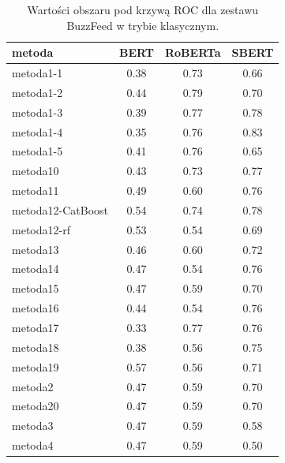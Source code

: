 \begin{table}[H]
	\centering
	\caption{Wartości obszaru pod krzywą ROC dla zestawu BuzzFeed w trybie klasycznym.}
	\label{tab:roc_auc_buzzfeed_classic}
	\small
	\begin{tabular}{lccc}
		\toprule
		\textbf{metoda}   & \textbf{BERT} & \textbf{RoBERTa} & \textbf{SBERT} \\
		\midrule
		metoda1-1         & 0.38          & 0.73             & 0.66           \\
		metoda1-2         & 0.44          & 0.79             & 0.70           \\
		metoda1-3         & 0.39          & 0.77             & 0.78           \\
		metoda1-4         & 0.35          & 0.76             & 0.83           \\
		metoda1-5         & 0.41          & 0.76             & 0.65           \\
		metoda10          & 0.43          & 0.73             & 0.77           \\
		metoda11          & 0.49          & 0.60             & 0.76           \\
		metoda12-CatBoost & 0.54          & 0.74             & 0.78           \\
		metoda12-rf       & 0.53          & 0.54             & 0.69           \\
		metoda13          & 0.46          & 0.60             & 0.72           \\
		metoda14          & 0.47          & 0.54             & 0.76           \\
		metoda15          & 0.47          & 0.59             & 0.70           \\
		metoda16          & 0.44          & 0.54             & 0.76           \\
		metoda17          & 0.33          & 0.77             & 0.76           \\
		metoda18          & 0.38          & 0.56             & 0.75           \\
		metoda19          & 0.57          & 0.56             & 0.71           \\
		metoda2           & 0.47          & 0.59             & 0.70           \\
		metoda20          & 0.47          & 0.59             & 0.70           \\
		metoda3           & 0.47          & 0.59             & 0.58           \\
		metoda4           & 0.47          & 0.59             & 0.50           \\

\end{tabular}
\end{table}
